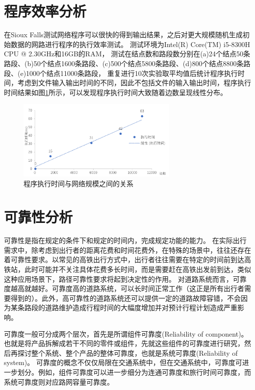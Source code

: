 \section{程序效率分析}\label{sec:程序效率分析}
在Sioux Falls测试网络程序可以很快的得到输出结果，之后对更大规模随机生成初始数据的网路进行程序的执行效率测试。
测试环境为Intel(R) Core(TM) i5-8300H CPU @ 2.30GHz和16GB的RAM，
测试在结点数和路段数分别在(a)24个结点50条路段、(b)50个结点1600条路段、(c)500个结点5800条路段、(d)800个结点8800条路段、(e)1000个结点11000条路段，
重复进行10次实验取平均值后统计程序执行时间，考虑到文件输入输出时间的不同，因此不包括文件的输入输出时间，程序执行时间结果如图\ref{fig:fig32}所示，可以发现程序执行时间大致随着边数呈现线性分布。
\begin{figure}[H] %
    \centering %
    \includegraphics[width=0.7\textwidth]{png/图片32 程序执行时间与网络规模之间的关系} %
    \caption{程序执行时间与网络规模之间的关系} %
    \label{fig:fig32} %
\end{figure}


\section{可靠性分析}\label{sec:可靠性分析}
可靠性是指在规定的条件下和规定的时间内，完成规定功能的能力。
在实际出行需求中，除考虑到出行者的距离花费和时间花费外，在特殊的场景中，往往还存在着可靠性要求。以常见的高铁出行方式中，出行者往往需要在特定的时间前到达高铁站，此时可能并不关注具体花费多长时间，而是需要赶在高铁出发前到达，类似这种应用场景下，路径可靠性要求将起到决定性的作用。
对道路系统而言，可靠度越高就越好。可靠度高的道路系统，可以长时间正常工作（这正是所有出行者需要得到的）。此外，高可靠性的道路系统还可以提供一定的道路故障容错，不会因为某条路段的道路维护造成行程时间的大幅度增加并对预计行程计划造成严重影响。

可靠度一般可分成两个层次，首先是所谓组件可靠度(Reliability of component)。也就是将产品拆解成若干不同的零件或组件，先就这些组件的可靠度进行研究，然后再探讨整个系统、整个产品的整体可靠度，也就是系统可靠度(Reliability of system)。
可靠度的概念不仅仅局限在交通系统中，但在交通系统中，可靠度可进一步划分。例如，组件可靠度可以进一步细分为连通可靠度和旅行时间可靠度，而系统可靠度则对应路网容量可靠度。

